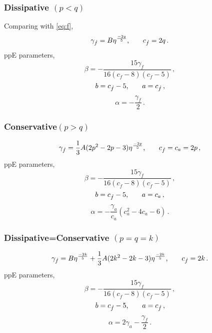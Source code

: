 \documentclass[11pt]{article}
\begin{document}
\subsubsection*{Dissipative $(p<q)$}
\hspace*{15.5pt}Comparing with \eqref{eq:f},
\begin{equation}
\gamma_{\dot{f}}=B\eta^\frac{-2q}{5}\text{,\hspace*{20pt}}c_{\dot{f}}=2q\,.
\end{equation}
ppE parameters,
\begin{equation}
\beta=-\frac{15 \text{$\gamma_{\dot{f}} $}}{16 (\text{$c_{\dot{f}}$}-8) (\text{$c_{\dot{f}}$}-5)}\,,
\end{equation}
\begin{equation}
b=c_{\dot{f}}-5\text{,\hspace*{20pt}}a=c_{\dot{f}}\,,
\end{equation}
\begin{equation}
\alpha=-\frac{\gamma_{\dot{f}}}{2}\,.
\end{equation}
\subsubsection*{Conservative$(p>q)$}
\begin{equation}
\gamma_{\dot{f}}=\frac{1}{3}A(2p^2-2p-3)\eta^{\frac{-2p}{5}}\text{,\hspace*{20pt}}c_{\dot{f}}=c_a=2p\,,
\end{equation}
ppE parameters,
\begin{equation}
\beta=-\frac{15 \gamma_{\dot{f}} }{16 (c_{\dot{f}}-8) (c_{\dot{f}}-5)}\,,
\end{equation}
\begin{equation}
b=c_{\dot{f}}-5\text{,\hspace*{20pt}}a=c_a\,,
\end{equation}
\begin{equation}
\alpha=-\frac{\gamma_a}{c_a}(c_a^2-4 c_a-6)\,.
\end{equation}
\subsubsection*{Dissipative=Conservative $(p=q=k)$}
\begin{equation}
\gamma_{\dot{f}}=B\eta^\frac{-2k}{5}+\frac{1}{3}A(2k^2-2k-3)\eta^{\frac{-2k}{5}}\text{,\hspace*{20pt}}c_{\dot{f}}=2k\,.
\end{equation}
ppE parameters,
\begin{equation}
\beta=-\frac{15 \text{$\gamma_{\dot{f}} $}}{16 (\text{$c_{\dot{f}}$}-8) (\text{$c_{\dot{f}}$}-5)}\,,
\end{equation}
\begin{equation}
b=c_{\dot{f}}-5\text{,\hspace*{20pt}}a=c_{\dot{f}}\,,
\end{equation}
\begin{equation}
\alpha=2 \text{$\gamma_a $}-\frac{\text{$\gamma_{\dot{f}} $}}{2}\,.
\end{equation}
\vspace{50pt}
\end{document}
